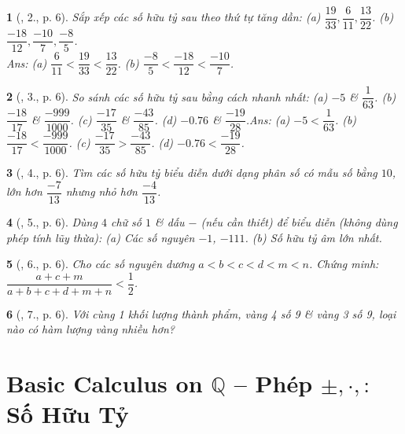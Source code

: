 \documentclass{article}
\newtheorem{baitoan}{}
\begin{document}
\begin{baitoan}[\cite{Tuyen_Toan_7}, 2., p. 6]
	Sắp xếp các số hữu tỷ sau theo thứ tự tăng dần: (a) $\dfrac{19}{33},\dfrac{6}{11},\dfrac{13}{22}$. (b) $\dfrac{-18}{12},\dfrac{-10}{7},\dfrac{-8}{5}$.\\\mbox{}\hfill{\sf Ans: (a) $\dfrac{6}{11} < \dfrac{19}{33} < \dfrac{13}{22}$. (b) $\dfrac{-8}{5} < \dfrac{-18}{12} < \dfrac{-10}{7}$.}
\end{baitoan}

\begin{baitoan}[\cite{Tuyen_Toan_7}, 3., p. 6]
	So sánh các số hữu tỷ sau bằng cách nhanh nhất: (a) $-5$ \& $\dfrac{1}{63}$. (b) $\dfrac{-18}{17}$ \& $\dfrac{-999}{1000}$. (c) $\dfrac{-17}{35}$ \& $\dfrac{-43}{85}$. (d) $-0.76$ \& $\dfrac{-19}{28}$.\hfill{\sf Ans: (a) $-5 < \dfrac{1}{63}$. (b) $\dfrac{-18}{17} < \dfrac{-999}{1000}$. (c) $\dfrac{-17}{35} > \dfrac{-43}{85}$. (d) $-0.76 < \dfrac{-19}{28}$.}
\end{baitoan}

\begin{baitoan}[\cite{Tuyen_Toan_7}, 4., p. 6]
	Tìm các số hữu tỷ biểu diễn dưới dạng phân số có mẫu số bằng $10$, lớn hơn $\dfrac{-7}{13}$ nhưng nhỏ hơn $\dfrac{-4}{13}$.
\end{baitoan}

\begin{baitoan}[\cite{Tuyen_Toan_7}, 5., p. 6]
	Dùng $4$ chữ số $1$ \& dấu $-$ (nếu cần thiết) để biểu diễn (không dùng phép tính lũy thừa): (a) Các số nguyên $-1$, $-111$. (b) Số hữu tỷ âm lớn nhất.
\end{baitoan}

\begin{baitoan}[\cite{Tuyen_Toan_7}, 6., p. 6]
	Cho các số nguyên dương $a < b < c < d < m < n$. Chứng minh: $\dfrac{a + c + m}{ a + b + c + d + m + n} < \dfrac{1}{2}$.
\end{baitoan}

\begin{baitoan}[\cite{Tuyen_Toan_7}, 7., p. 6]
	Với cùng 1 khối lượng thành phẩm, vàng 4 số 9 \& vàng 3 số 9, loại nào có hàm lượng vàng nhiều hơn?
\end{baitoan}


\section{Basic Calculus on $\mathbb{Q}$ -- Phép $\pm,\cdot,:$ Số Hữu Tỷ}
\end{document}
